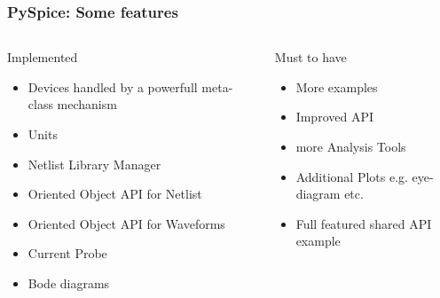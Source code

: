 \begin{frame}
  \frametitle{PySpice: Some features}
  \begin{columns}[T]
    \begin{column}{.5\textwidth}
      Implemented
      \begin{itemize}
      \item Devices handled by a powerfull meta-class mechanism
      \item Units
      \item Netlist Library Manager
      \item Oriented Object API for Netlist
      \item Oriented Object API for Waveforms
      \item Current Probe
      \item Bode diagrams
      \end{itemize}
    \end{column}
    \begin{column}{.5\textwidth}
      \alert{Must to have}
      \begin{itemize}
      \item More examples
      \item Improved API
      \item more Analysis Tools
      \item Additional Plots e.g. eye-diagram etc.\@
      \item Full featured shared API example
      \end{itemize}
    \end{column}
  \end{columns}
\end{frame}

